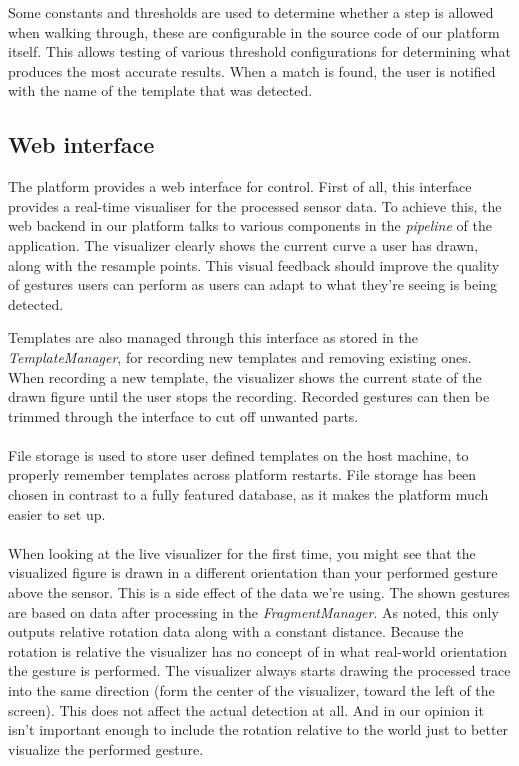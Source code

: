 \documentclass{standalone}
\begin{document}
  Some constants and thresholds are used to determine whether a
  step is allowed when walking through, these are configurable in the source
  code of our platform itself. This allows testing of various threshold
  configurations for determining what produces the most accurate results.
  When a match is found, the user is notified with the name of the template that
  was detected.

  \subsection{Web interface}
  The platform provides a web interface for control. First of all, this
  interface provides a real-time visualiser for the processed sensor data. To
  achieve this, the web backend in our platform talks to various components in
  the \emph{pipeline} of the application. The visualizer clearly shows the
  current curve a user has drawn, along with the resample points. This visual
  feedback should improve the quality of gestures users can perform as users
  can adapt to what they're seeing is being detected.

  Templates are also managed through this interface as stored in the
  \emph{TemplateManager}, for recording new templates and removing existing
  ones. When recording a new template, the visualizer shows the current state
  of the drawn figure until the user stops the recording. Recorded gestures can
  then be trimmed through the interface to cut off unwanted parts.

  \paragraph{}
  File storage is used to store user defined templates on the host machine, to
  properly remember templates across platform restarts. File storage has been
  chosen in contrast to a fully featured database, as it makes the platform much
  easier to set up.

  \paragraph{}
  When looking at the live visualizer for the first time, you might see that the
  visualized figure is drawn in a different orientation than your performed
  gesture above the sensor. This is a side effect of the data we're using. The
  shown gestures are based on data after processing in the
  \emph{FragmentManager}. As noted, this only outputs relative rotation data
  along with a constant distance. Because the rotation is relative the
  visualizer has no concept of in what real-world orientation the gesture is
  performed. The visualizer always starts drawing the processed trace into the
  same direction (form the center of the visualizer, toward the left of the
  screen). This does not affect the actual detection at all. And in our opinion
  it isn't important enough to include the rotation relative to the world just
  to better visualize the performed gesture.


  \clearpage
\end{document}
